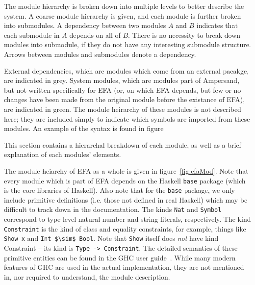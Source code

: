 The module hierarchy is broken down into multiple levels to better describe the
system.  A coarse module hierarchy is given, and each module is further broken
into submodules.  A dependency between two modules $A$ and $B$ indicates that
each submodule in $A$ depends on all of $B$. There is no necessity to break
down modules into submodule, if they do not have any interesting submodule 
structure. Arrows between modules and submodules denote a dependency. 

External dependencies, which are modules which come from an external pacakge,
are indicated in {\color{grey}grey}. System modules, which are modules part of
Ampersand, but not written specifically for EFA (or, on which EFA depends, but
few or no changes have been made from the original module before the existance
of EFA), are indicated in {\color{applegreen}green}. The module heirarchy of
these modules is not described here; they are included simply to indicate which
symbols are imported from these modules. An example of the syntax is found in
figure%

This section contains a hierarchal breakdown of each module, as well as a brief
explanation of each modules' elements. 

The module heiarchy of EFA as a whole is given in figure~\ref{fig:efaMod}.  Note
that every module which is part of EFA depends on the Haskell \texttt{base} 
package
(which is the core libraries of Haskell). Also note that for the \texttt{base}
package, we only include primitive definitions (i.e. those not defined in real
Haskell) which may be difficult to track down in the documentation. The kinds
\lstinline{Nat} and \lstinline{Symbol} correspond to type level natural number 
and string
literals, respectively. The kind \lstinline{Constraint} is the kind of class and
equality constraints, for example, things like \lstinline{Show x} and 
\lstinline[mathescape]|Int $\sim$ Bool|.  
Note that \texttt{Show} itself does \emph{not} have kind Constraint --
its kind is \lstinline{Type -> Constraint}. The detailed semantics of these
primitive entities can be found in the GHC user guide~\cite{ghcUserGuide}. While
many modern features of GHC are used in the actual implementation, they are not
mentioned in, nor required to understand, the module description.


